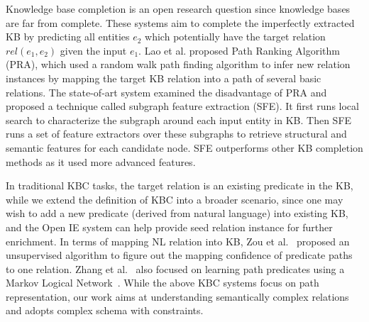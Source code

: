 Knowledge base completion is an open research question 
\cite{gardner2014incorporating,lao2011random,gardner2015efficient}
since knowledge bases are far from complete.
These systems aim to complete the imperfectly extracted KB by predicting all entities $e_2$
which potentially have the target relation $rel(e_1, e_2)$ given the input $e_1$. 
Lao et al.  proposed Path Ranking Algorithm (PRA),
which used a random walk path finding algorithm to infer new relation instances by 
mapping the target KB relation into a path of several basic relations.
The state-of-art system \cite{gardner2015efficient} 
examined the disadvantage of PRA and proposed a technique called subgraph feature extraction (SFE). 
It first runs local search to characterize the subgraph around each input entity in KB.
Then SFE runs a set of feature extractors over these subgraphs to retrieve
structural and semantic features for each candidate node. 
SFE outperforms other KB completion methods as it used more advanced features.

In traditional KBC tasks, the target relation is an existing predicate in the KB, 
while we extend the definition of KBC into a broader scenario, since one may wish to add
a new predicate (derived from natural language) into existing KB, and the Open IE system
can help provide seed relation instance for further enrichment.
In terms of mapping NL relation into KB, Zou et al.~ proposed an unsupervised algorithm to
figure out the mapping confidence of predicate paths to one relation.
Zhang et al.~ also focused on learning path predicates using a Markov Logical Network~\cite{richardson2006markov}. 
While the above KBC systems focus on path representation, our work aims at understanding
semantically complex relations and adopts complex schema with constraints.


